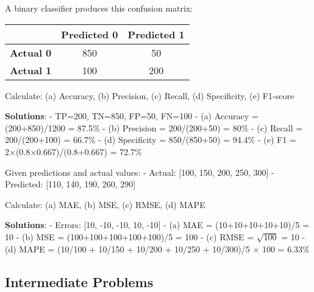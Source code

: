 \documentclass{article}
\newcounter{exercise}
\begin{document}
\begin{tcolorbox}[colback=gray!5!white,colframe=gray!75!black,title=Problem \stepcounter{exercise}\#\theexercise: Confusion Matrix Calculations]
A binary classifier produces this confusion matrix:

\begin{center}
\begin{tabular}{|c|c|c|}
\hline
& \textbf{Predicted 0} & \textbf{Predicted 1} \\
\hline
\textbf{Actual 0} & 850 & 50 \\
\hline
\textbf{Actual 1} & 100 & 200 \\
\hline
\end{tabular}
\end{center}

Calculate: (a) Accuracy, (b) Precision, (c) Recall, (d) Specificity, (e) F1-score

\textbf{Solutions}:
- TP=200, TN=850, FP=50, FN=100
- (a) Accuracy = (200+850)/1200 = 87.5\%
- (b) Precision = 200/(200+50) = 80\%  
- (c) Recall = 200/(200+100) = 66.7\%
- (d) Specificity = 850/(850+50) = 94.4\%
- (e) F1 = 2×(0.8×0.667)/(0.8+0.667) = 72.7\%
\end{tcolorbox}

\begin{tcolorbox}[colback=gray!5!white,colframe=gray!75!black,title=Problem \stepcounter{exercise}\#\theexercise: Regression Metrics]
Given predictions and actual values:
- Actual: [100, 150, 200, 250, 300]
- Predicted: [110, 140, 190, 260, 290]

Calculate: (a) MAE, (b) MSE, (c) RMSE, (d) MAPE

\textbf{Solutions}:
- Errors: [10, -10, -10, 10, -10]
- (a) MAE = (10+10+10+10+10)/5 = 10
- (b) MSE = (100+100+100+100+100)/5 = 100  
- (c) RMSE = $\sqrt{100}$ = 10
- (d) MAPE = (10/100 + 10/150 + 10/200 + 10/250 + 10/300)/5 × 100 = 6.33\%
\end{tcolorbox}

\subsection{Intermediate Problems}
\end{document}
